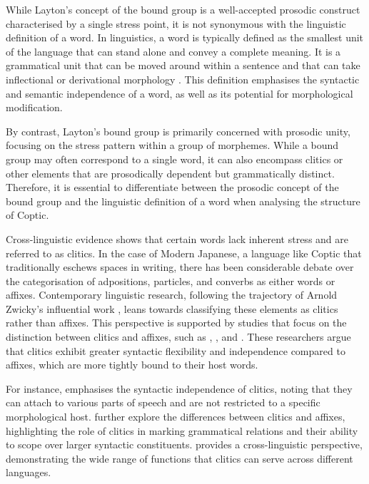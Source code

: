 \documentclass[output=paper,colorlinks,citecolor=brown ,chinesefont]{langscibook}
\begin{document}
While Layton's concept of the bound group is a well-accepted prosodic construct characterised by a single stress point, it is not synonymous with the linguistic definition of a word. In linguistics, a word is typically defined as the smallest unit of the language that can stand alone and convey a complete meaning. It is a grammatical unit that can be moved around within a sentence and that can take inflectional or derivational morphology \citep{aronofffudeman}. This definition emphasises the syntactic and semantic independence of a word, as well as its potential for morphological modification.

By contrast, Layton's bound group is primarily concerned with prosodic unity, focusing on the stress pattern within a group of morphemes. While a bound group may often correspond to a single word, it can also encompass clitics or other elements that are prosodically dependent but grammatically distinct. Therefore, it is essential to differentiate between the prosodic concept of the bound group and the linguistic definition of a word when analysing the structure of Coptic.

Cross-linguistic evidence shows that certain words lack inherent stress and are referred to as clitics. In the case of Modern Japanese, a language like Coptic that traditionally eschews spaces in writing, there has been considerable debate over the categorisation of adpositions, particles, and converbs as either words or affixes. Contemporary linguistic research, following the trajectory of Arnold Zwicky's influential work \citep{zwicky1,zwicky2,zwickypullum}, leans towards classifying these elements as clitics rather than affixes. This perspective is supported by studies that focus on the distinction between clitics and affixes, such as \citet{anderson2005}, \citet{spencerluis2012}, and \citet{haspelmath2015}. These researchers argue that clitics exhibit greater syntactic flexibility and independence compared to affixes, which are more tightly bound to their host words.

For instance, \citet{anderson2005} emphasises the syntactic independence of clitics, noting that they can attach to various parts of speech and are not restricted to a specific morphological host. \citet{spencerluis2012} further explore the differences between clitics and affixes, highlighting the role of clitics in marking grammatical relations and their ability to scope over larger syntactic constituents. \citet{haspelmath2015} provides a cross-linguistic perspective, demonstrating the wide range of functions that clitics can serve across different languages.
\end{document}
